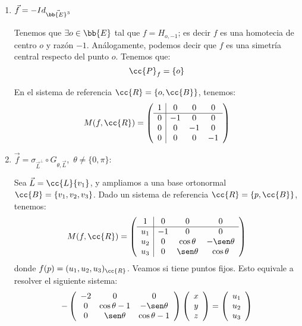 \begin{enumerate}
    \item $\vec{f} = -Id_{\vec{\bb{E}^3}}$

    Tenemos que $\exists o\in \bb{E}$ tal que $f=H_{o, -1}$; es decir $f$ es una homotecia de centro $o$ y razón $-1$. Análogamente, podemos decir que $f$ es una simetría central respecto del punto $o$. Tenemos que:
    \begin{equation*}
        \cc{P}_f = \{o\}
    \end{equation*}

    En el sistema de referencia $\cc{R}=\{o,\cc{B}\}$, tenemos:
    \begin{equation*}
        M(f,\cc{R}) = \left(\begin{array}{c|ccc}
            1 & 0 & 0 & 0 \\ \hline
            0 & -1 & 0 & 0 \\
            0 & 0 & -1 & 0 \\
            0 & 0 & 0 & -1 \\
        \end{array}\right)
    \end{equation*}

    \item $\vec{f}=\sigma_{\vec{L}^\perp}\circ G_{\theta, \vec{L}}$,~$\theta\neq \{0,\pi\}$:

    Sea $\vec{L}=\cc{L}\{v_1\}$, y ampliamos a una base ortonormal $\cc{B}=\{v_1,v_2,v_3\}$. Dado un sistema de referencia $\cc{R}=\{p,\cc{B}\}$, tenemos:
    \begin{equation*}
        M(f,\cc{R}) = \left(\begin{array}{c|ccc}
            1 & 0 & 0 & 0 \\ \hline
            u_1 & -1 & 0 & 0 \\
            u_2 & 0 & \cos\theta & -\sen\theta \\
            u_3 & 0 & \sen\theta & \cos\theta \\
        \end{array}\right)
    \end{equation*}
    donde $f(p)=(u_1,u_2,u_3)_{\cc{R}}$. Veamos si tiene puntos fijos. Esto equivale a resolver el siguiente sistema:
    \begin{equation*}
        -\left(\begin{array}{ccc}
            -2 & 0 & 0 \\
            0 & \cos\theta-1 & -\sen\theta \\
            0 & \sen\theta & \cos\theta-1 \\
        \end{array}\right)
        \left(\begin{array}{c}
            x\\y\\z
        \end{array}\right)=
        \left(\begin{array}{c}
            u_1\\u_2\\u_3
        \end{array}\right)
    \end{equation*}


\end{enumerate}
